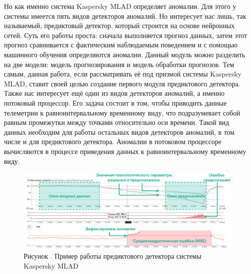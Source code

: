 {  \par \redline Но как именно система Kaspersky MLAD определяет аномалии. Для этого у системы имеется пять видов детекторов аномалий. Но интересует нас лишь, так называемый, предиктовый детектор, который строится на основе нейронных сетей. Суть его работы проста: сначала выполняется прогноз данных, затем этот прогноз сравнивается с фактическим наблюдаемым поведением и с помощью машинного обучения определяются аномалии. Данный модуль можно разделить на две модели: модель прогнозирования и модель обработки прогнозов. Тем самым, данная работа, если рассматривать её под призмой системы Kaspersky MLAD, ставит своей целью создание первого модуля предиктового детектора. Также нас интересует ещё один из видов детекторов аномалий, а именно потоковый процессор. Его задача состоит в том, чтобы приводить данные телеметрии к равноинтервальному временному виду, что подразумевает собой равным промежутки между точками относительно оси времени. Такой вид данных необходим для работы остальных видов детекторов аномалий, в том числе и для предиктового детектора. Аномалии в потоковом процессоре вычисляются в процессе приведения данных к равноинтервальному временному виду.

  \begin{figure}
    \centering
    \def\svgwidth{\textwidth}
    \includegraphics[scale=0.6]{images/MLADex.png}
    \caption*{\gostFont Рисунок \thechaptercntr .\theimagecntr \spc {--} Пример работы предиктового детектора системы Kaspersky MLAD}
    \label{fig:PredictDetector}
  \end{figure}

}
